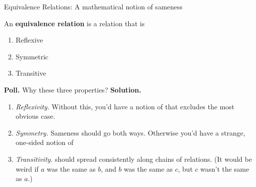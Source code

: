 \documentclass[10pt]{beamer}
\begin{document}
\begin{frame}{Equivalence Relations: A mathematical notion of \alert{sameness}}
\pause 
\begin{myredbox}[title=Definition]
An \textbf{equivalence relation} is a relation that is
\begin{enumerate}
\item Reflexive \greencheck
\item Symmetric \greencheck
\item Transitive \greencheck
\end{enumerate}
\end{myredbox}	

\vfill 
\pause 
\colorbox{yellow!30}{\textbf{Poll.}} Why these three properties?
 \vfill 
\pause 
\colorbox{green!30}{\textbf{Solution.}}
\begin{enumerate}
\item \textit{Reflexivity.}  \pause Without this, you’d have a notion of  that excludes the most obvious case.
\item \textit{Symmetry.} \pause Sameness should go both ways. Otherwise you’d have a strange, one-sided notion of 
\item \textit{Transitivity.} \pause {} should spread consistently along chains of relations. (It would be weird if $a$ was the same as $b$, and $b$ was the same as $c$, but $c$ wasn't the same as $a$.) 
\end{enumerate}

\end{frame}
\end{document}
